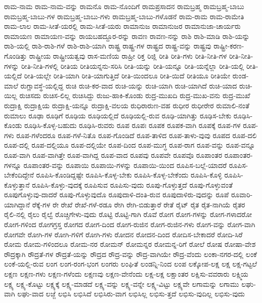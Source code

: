 {ರಾಮ-ನಾಮ
ರಾಮ-ನಾಮ-ವನ್ನು
ರಾಮನೊ
ರಾಮ-ನೊಂದಿಗೆ
ರಾಮಪ್ರಸಾದನ
ರಾಮಬ್ರಹ್ಮ
ರಾಮಬ್ರಹ್ಮ-ಬಾಬು
ರಾಮಬ್ರಹ್ಮ-ಬಾಬು-ಗಳ
ರಾಮಬ್ರಹ್ಮ-ಬಾಬು-ಗಳು
ರಾಮಬ್ರಹ್ಮ-ಬಾಬು-ಗಳೊಡನೆ
ರಾಮ-ರಾಮ
ರಾಮ-ರಾಮೇತಿ
ರಾಮ-ಲಾಲ
ರಾಮ-ಸೀತೆ-ಯರಲ್ಲಿ
ರಾಮ-ಸೀತೆ-ಯರು
ರಾಮಾನುಜ
ರಾಮಾನುಜರ
ರಾಮಾನುಜಾ-ಚಾರ್ಯರು
ರಾಮಾಯಣ
ರಾಮಾಯಣ-ವನ್ನು
ರಾಯಬಹದ್ದೂರ-ರನ್ನು
ರಾವಣ
ರಾವಣ-ನನ್ನು
ರಾಶಿ
ರಾಶಿ-ಮಾಡಿ
ರಾಶಿ-ಯನ್ನು
ರಾಶಿ-ಯಲ್ಲಿ
ರಾಶಿ-ರಾಶಿ-ಗಳೆ
ರಾಶಿ-ರಾಶಿ-ಯಾಗಿ
ರಾಷ್ಟ್ರ
ರಾಷ್ಟ್ರ-ಗಳ
ರಾಷ್ಟ್ರದ
ರಾಷ್ಟ್ರ-ವನ್ನು
ರಾಷ್ಟ್ರವು
ರಾಷ್ಟ್ರೀ-ಕರಣ-ಗೊಂಡಿತ್ತು
ರಾಷ್ಟ್ರೀಯ
ರಾಷ್ಟ್ರೀಯತ್ವವು
ರಾಸ-ಮಣಿಯ
ರಾಹ್ರೀ
ರಿಕ್ತ
ರಿಜ್ಲಿ
ರೀತಿ
ರೀತಿ-ಗಳು
ರೀತಿ-ನೀತಿ-ಗಳ
ರೀತಿ-ನೀತಿ-ಗಳನ್ನು
ರೀತಿ-ನೀತಿ-ಗಳಲ್ಲಿ
ರೀತಿಯ
ರೀತಿಯನ್ನನು-ಸರಿಸಿ
ರೀತಿ-ಯನ್ನು
ರೀತಿ-ಯನ್ನೂ
ರೀತಿ-ಯನ್ನೆಲ್ಲಾ
ರೀತಿ-ಯಲ್ಲಿ
ರೀತಿ-ಯಲ್ಲಿದೆ
ರೀತಿ-ಯಲ್ಲೇ
ರೀತಿ-ಯಾಗಿ
ರೀತಿ-ಯಾಗುತ್ತಿದೆ
ರೀತಿ-ಯಿಂದಲೂ
ರೀತಿ-ಯಿದೆ
ರೀತಿಯೂ
ರೀತಿಯೇ
ರುಂಡ-ಮಾಲೆ
ರುಗ್ಣಾವಸ್ಥೆ-ಯಲ್ಲಿದ್ದ
ರುಚಿ
ರುಚಿ-ಕರ-ವಾದ
ರುಚಿ-ಯನ್ನು
ರುಚಿ-ಯಾಗಿ
ರುಚಿ-ಯಾಗಿದೆ
ರುಚಿ-ಯಾದ
ರುಚಿ-ಯಿಲ್ಲ
ರುಚಿಸದು
ರುಚಿಸ-ಲಿಲ್ಲ
ರುಚಿಸಿದ್ದು
ರುಜು-ಹಾಕಿ-ಕೊಂಡು
ರುದ್ರ-ಮುಖದಿ
ರುದ್ರ-ಮುಖ-ವನು
ರುದ್ರ-ಮುಖೆ
ರುದ್ರಾಕ್ಷಿ
ರುದ್ರಾಕ್ಷಿಯ
ರುದ್ರಾಕ್ಷಿ-ಯನ್ನೂ
ರುದ್ರಾಕ್ಷಿ-ವಲಯ
ರುಧಿರಾರುಣ-ವಹ
ರುಧೀರ
ರುಧೀರೇರ
ರುಮಾಲಿ-ನಂತೆ
ರುಮಾಲು
ರೂಢಾ
ರೂಢಿಗೆ
ರೂಢಿಯ
ರೂಢಿಯಲ್ಲಿದೆ
ರೂಢಿಯಲ್ಲಿ-ರುವ
ರೂಢಿ-ಯಾಗಿತ್ತು
ರೂಢಿಸ-ಬೇಕು
ರೂಢಿಸಿ-ಕೊಂಡು
ರೂಢಿಸಿ-ಕೊಳ್ಳ-ಬಹುದು
ರೂಢಿಸಿ-ರುವರು
ರೂಪ
ರೂಪಃ
ರೂಪಕ
ರೂಪಕ-ವಾಗಿ
ರೂಪಕ್ಕೆ
ರೂಪ-ಗಳ
ರೂಪ-ಗಳು
ರೂಪ-ಗಳೆಂದರೂ
ರೂಪ-ಗಳೆ-ನಿತೊ
ರೂಪ-ಗೊಂಡಿದೆ
ರೂಪ-ತಾಳಿದ
ರೂಪ-ತಾಳು-ವುವು
ರೂಪದ
ರೂಪ-ದಲಿ
ರೂಪ-ದಲ್ಲಿ
ರೂಪ-ದಲ್ಲಿಯೂ
ರೂಪ-ದಲ್ಲಿಯೇ
ರೂಪ-ದಿಂದ
ರೂಪ-ಮುಗ್ಧ
ರೂಪ-ರಾಗ
ರೂಪ-ವನ್ನು
ರೂಪ-ವನ್ನೂ
ರೂಪ-ವಾಗಿ
ರೂಪ-ವಾಗಿತ್ತೇ
ರೂಪ-ವಾಗಿದ್ದ
ರೂಪ-ವಾದ
ರೂಪವು
ರೂಪವೇ
ರೂಪವೊ
ರೂಪಾಂತರ
ರೂಪಾಂತರ-ಗಳನ್ನೂ
ರೂಪಾಂತರ-ವನ್ನು
ರೂಪಾಯಿ
ರೂಪಾಯಿ-ಗಳನ್ನು
ರೂಪಾಯಿ-ಯಿಂದ
ರೂಪಿಸ-ಬಲ್ಲೆ-ಯಾದರೆ
ರೂಪಿಸ-ಬೇಕೆಂದಿದ್ದೇನೆ
ರೂಪಿಸಿ-ಕೊಂಡಿದ್ದಷ್ಟೇ
ರೂಪಿಸಿ-ಕೊಳ್ಳ-ಬೇಕು
ರೂಪಿಸಿ-ಕೊಳ್ಳ-ಬೇಕೆಂದು
ರೂಪಿಸಿ-ಕೊಳ್ಳಿ
ರೂಪಿಸಿ-ಕೊಳ್ಳುತ್ತಾನೆ
ರೂಪಿಸಿ-ಕೊಳ್ಳು-ವುದಕ್ಕೆ
ರೂಪಿಸುವ
ರೂಪಿಸು-ವುದು
ರೂಪು-ಗೊಳ್ಳುತ್ತದೆ
ರೂಪು-ಗೊಳ್ಳುವಂತೆ
ರೂಪುಗೊಳ್ಳುವು-ದಾದರೆ
ರೂಪು-ಗೊಳ್ಳುವುದೊ
ರೂಪುದಾಳಿ-ದಂತಿ-ರುವ
ರೂಪುದಾಳಿರು-ವುದನ್ನು
ರೂಪೆ
ರೂವಾರಿ-ಯಾಗಿದ್ದಾನೆ
ರೆಕ್ಕೆ-ಗಳ
ರೇ
ರೇಖೆ
ರೇಖೆ-ಗಳೆ-ರಡೂ
ರೇಗಿ
ರೇಗಿ-ಬಿಡುತ್ತಾರೆ
ರೇತೆ
ರೈಟ್
ರೈತ
ರೈತ-ನಾಗಿಯೆ
ರೈತರ
ರೈಲಿ-ನಲ್ಲಿ
ರೈಲು
ರೈಲ್ವೆ
ರೊಚ್ಚಿಗೇಳು-ವುದು
ರೊಟ್ಟಿ
ರೊಟ್ಟಿ-ಗಾಗಿ
ರೊವೆ
ರೋಗ
ರೋಗ-ಗಳನ್ನು
ರೋಗ-ಗಳಾದರೋ
ರೋಗ-ಗಳಿಂದ
ರೋಗಗ್ರಸ್ತ
ರೋಗದ
ರೋಗ-ದಿಂದ
ರೋಗ-ರುಜಿನ
ರೋಗ-ರುಜಿನ-ಗಳು
ರೋಗ-ವನ್ನು
ರೋಗ-ವಾಗಿ
ರೋಗವೇ
ರೋಗಿ-ಗಳ
ರೋಗಿ-ಗಳಿಗೆ
ರೋಗಿ-ಗಳು
ರೋದನ
ರೋದನ-ದಿಂದ
ರೋದಿಸ-ಬೇಕಾದರೆ
ರೋದಿ-ಸಿರೆ
ರೋಮ
ರೋಮ-ಗಳಿಂದಲೂ
ರೋಮ-ನರ
ರೋಮನ್
ರೋಮನ್ನರ
ರೋಮನ್ನ-ರಿಗೆ
ರೋಲೆ
ರೋಷ
ರೋಷಾ-ವೇಶ
ರೌದ್ರಕ್ಕಾಗಿ
ರೌದ್ರತೆ-ಗಳ
ರೌದ್ರತೆ-ಯನ್ನು
ರೌದ್ರದ
ರೌದ್ರ-ವನ್ನು
ರೌದ್ರ-ವಾಗಿಯೇ
ರೌದ್ರ-ವೆಂದು
ಲಂಕಾ-ನಗರ-ದಲ್ಲಿ
ಲಂಕೆ
ಲಂಕೆ-ಯಲ್ಲಿ-ರುವ
ಲಂಗ
ಲಂಗ-ರಂಗ-ಭಂಗ
ಲಂಗರು
ಲಂಘಿತೆ
ಲಂಡನ್ನಿ-ನಿಂದ
ಲಂಪ
ಲಕ್ಕೋಪ-ಲಕ್ಷ
ಲಕ್ಷ
ಲಕ್ಷ-ಗಟ್ಟಲೆ
ಲಕ್ಷಣ
ಲಕ್ಷಣ-ಗಳು
ಲಕ್ಷಣ-ಗಳೆಂದು
ಲಕ್ಷಣವು
ಲಕ್ಷಣ-ವೇನೆಂದು
ಲಕ್ಷ-ಲಕ್ಷ
ಲಕ್ಷಾಂತರ
ಲಕ್ಷಿಸು-ವವರಾರು
ಲಕ್ಷ್ಮಿಯ
ಲಕ್ಷ್ಯ
ಲಕ್ಷ್ಯ-ಕೊಟ್ಟು
ಲಕ್ಷ್ಯಕ್ಕೆ
ಲಕ್ಷ್ಯ-ಮಾಡದೆ
ಲಕ್ಷ್ಯ-ವನ್ನು
ಲಕ್ಷ್ಯ-ವನ್ನೇ
ಲಕ್ಷ್ಯ-ವಿಟ್ಟು
ಲಕ್ಷ್ಯವೇ
ಲಗಾಮನ್ನು
ಲಗಾಮು
ಲಘು-ವಾಗಿ
ಲಘು-ವಾದ
ಲಜ್ಜೆ
ಲಭಿಸಿ
ಲಭಿಸಿದೆ
ಲಭಿಸಿರು-ವಾಗ
ಲಭಿಸಿಲ್ಲ
ಲಭಿಸು-ತ್ತದೆ
ಲಭಿಸು-ವುದಿಲ್ಲ
ಲಭಿಸು-ವುದು
}
